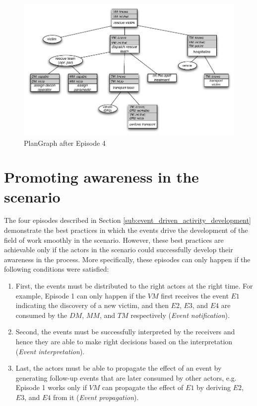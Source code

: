 \begin{figure}[htbp] %
	\centering
	\includegraphics{plangraph_ep4.pdf} 
	\caption{PlanGraph after Episode 4}
	\label{fig:plangraph_ep4}
\end{figure}

\section{Promoting awareness in the scenario} %
\label{sec:promoting_awareness_in_the_scenario}
The four episodes described in Section \ref{sub:event_driven_activity_development} demonstrate the best practices in which the events drive the development of the field of work smoothly in the scenario. However, these best practices are achievable only if the actors in the scenario could successfully develop their awareness in the process. More specifically, these episodes can only happen if the following conditions were satisfied:

\begin{enumerate}
	\item First, the events must be distributed to the right actors at the right time. For example, Episode 1 can only happen if the $VM$ first receives the event $E1$ indicating the discovery of a new victim, and then $E2$, $E3$, and $E4$ are consumed by the $DM$, $MM$, and $TM$ respectively (\emph{Event notification}).
	\item Second, the events must be successfully interpreted by the receivers and hence they are able to make right decisions based on the interpretation (\emph{Event interpretation}). 
	\item Last, the actors must be able to propagate the effect of an event by generating follow-up events that are later consumed by other actors, e.g. Episode 1 works only if $VM$ can propagate the effect of $E1$ by deriving $E2$, $E3$, and $E4$ from it (\emph{Event propagation}).
\end{enumerate}


